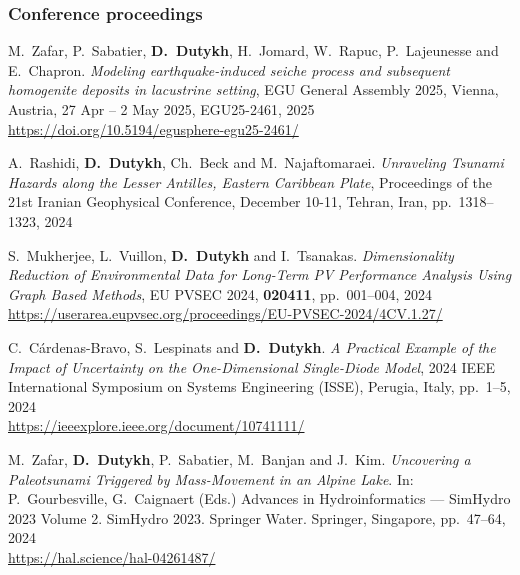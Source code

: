 \separator
\subsubsection{Conference proceedings}

\begin{etaremune}



  \item M.~Zafar, P.~Sabatier, \textbf{D.~Dutykh}, H.~Jomard, W.~Rapuc, P.~Lajeunesse and E.~Chapron. \textit{Modeling earthquake-induced seiche process and subsequent homogenite deposits in lacustrine setting}, EGU General Assembly 2025, Vienna, Austria, 27 Apr -- 2 May 2025, EGU25-2461, 2025 \\
  \url{https://doi.org/10.5194/egusphere-egu25-2461/}
  


  \item A.~Rashidi, \textbf{D.~Dutykh}, Ch.~Beck and M.~Najaftomaraei. \textit{Unraveling Tsunami Hazards along the Lesser Antilles, Eastern Caribbean Plate}, Proceedings of the 21st Iranian Geophysical Conference, December 10-11, Tehran, Iran, pp.~1318--1323, 2024 %

  \item S.~Mukherjee, L.~Vuillon, \textbf{D.~Dutykh} and I.~Tsanakas. \textit{Dimensionality Reduction of Environmental Data for Long-Term PV Performance Analysis Using Graph Based Methods}, EU PVSEC 2024, \textbf{020411}, pp.~001--004, 2024 \\
  \url{https://userarea.eupvsec.org/proceedings/EU-PVSEC-2024/4CV.1.27/}

  \item C.~C\'ardenas-Bravo, S.~Lespinats and \textbf{D.~Dutykh}. \textit{A Practical Example of the Impact of Uncertainty on the One-Dimensional Single-Diode Model}, 2024 IEEE International Symposium on Systems Engineering (ISSE), Perugia, Italy, pp.~1--5, 2024 \\
  \url{https://ieeexplore.ieee.org/document/10741111/}

  \item M.~Zafar, \textbf{D.~Dutykh}, P.~Sabatier, M.~Banjan and J.~Kim. \textit{Uncovering a Paleotsunami Triggered by Mass-Movement in an Alpine Lake}. In: P.~Gourbesville, G.~Caignaert (Eds.) Advances in Hydroinformatics --- SimHydro 2023 Volume 2. SimHydro 2023. Springer Water. Springer, Singapore, pp.~47--64, 2024 \\ %
  \url{https://hal.science/hal-04261487/}


\end{etaremune}
